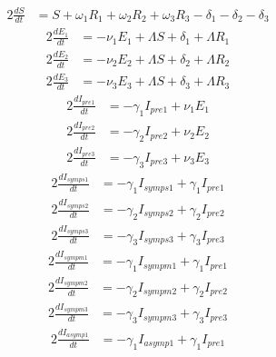 \documentclass{article}%
\begin{document}
%
\begin{alignat*}{2}%
\frac{dS}{dt} &= S +  \omega_{1} R_{1} +  \omega_{2} R_{2} +  \omega_{3} R_{3}  -\delta_{1}  -\delta_{2}  -\delta_{3}%
\end{alignat*}%
\begin{alignat*}{2}%
\frac{dE_{1}}{dt} &= -\nu_{1} E_{1} +  \Lambda S +  \delta_{1} +  \Lambda R_{1}%
\end{alignat*}%
\begin{alignat*}{2}%
\frac{dE_{2}}{dt} &= -\nu_{2} E_{2} +  \Lambda S +  \delta_{2} +  \Lambda R_{2}%
\end{alignat*}%
\begin{alignat*}{2}%
\frac{dE_{3}}{dt} &= -\nu_{3} E_{3} +  \Lambda S +  \delta_{3} +  \Lambda R_{3}%
\end{alignat*}%
\begin{alignat*}{2}%
\frac{dI_{pre1}}{dt} &= -\gamma_{1} I_{pre1} +  \nu_{1} E_{1}%
\end{alignat*}%
\begin{alignat*}{2}%
\frac{dI_{pre2}}{dt} &= -\gamma_{2} I_{pre2} +  \nu_{2} E_{2}%
\end{alignat*}%
\begin{alignat*}{2}%
\frac{dI_{pre3}}{dt} &= -\gamma_{3} I_{pre3} +  \nu_{3} E_{3}%
\end{alignat*}%
\begin{alignat*}{2}%
\frac{dI_{symps1}}{dt} &= -\gamma_{1} I_{symps1} +  \gamma_{1} I_{pre1}%
\end{alignat*}%
\begin{alignat*}{2}%
\frac{dI_{symps2}}{dt} &= -\gamma_{2} I_{symps2} +  \gamma_{2} I_{pre2}%
\end{alignat*}%
\begin{alignat*}{2}%
\frac{dI_{symps3}}{dt} &= -\gamma_{3} I_{symps3} +  \gamma_{3} I_{pre3}%
\end{alignat*}%
\begin{alignat*}{2}%
\frac{dI_{sympm1}}{dt} &= -\gamma_{1} I_{sympm1} +  \gamma_{1} I_{pre1}%
\end{alignat*}%
\begin{alignat*}{2}%
\frac{dI_{sympm2}}{dt} &= -\gamma_{2} I_{sympm2} +  \gamma_{2} I_{pre2}%
\end{alignat*}%
\begin{alignat*}{2}%
\frac{dI_{sympm3}}{dt} &= -\gamma_{3} I_{sympm3} +  \gamma_{3} I_{pre3}%
\end{alignat*}%
\begin{alignat*}{2}%
\frac{dI_{asymp1}}{dt} &= -\gamma_{1} I_{asymp1} +  \gamma_{1} I_{pre1}%
\end{alignat*}%
\end{document}
